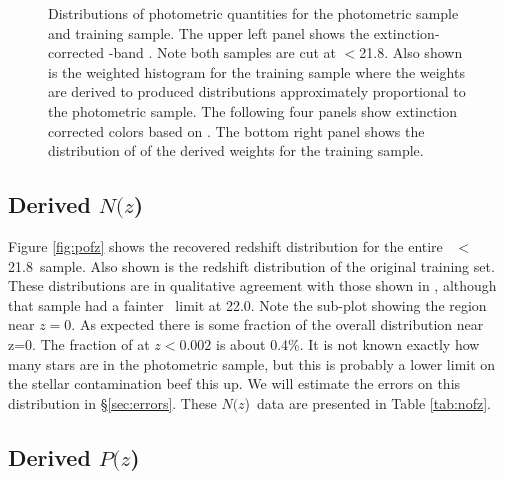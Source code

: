 \documentclass[preprint]{aastex}
\newcommand{\rmax}{21.8}
\newcommand{\pofz}{$P(z$)}
\newcommand{\Nofz}{$N(z$)}
\begin{document}
\begin{figure}[p] \centering

    \caption{Distributions of photometric quantities for the photometric sample
    and training sample.  The upper left panel shows the extinction-corrected
    \rmag-band \cmodelmag.  Note both samples are cut at \rmag$ < $\rmax.  
    Also shown is the weighted histogram for the training sample where
    the weights are derived to produced distributions approximately 
    proportional to the photometric sample.
    The following four panels show extinction corrected colors based on
    \modelmag.  The bottom right panel shows the distribution of of the
    derived weights for the training sample. }
    \label{fig:varhist}

    \vspace{2em}
\end{figure}

\subsection{Derived \Nofz}

Figure \ref{fig:pofz} shows the recovered redshift distribution for the entire
\rmag\ $<$ \rmax\ sample.  Also shown is the redshift distribution of the
original training set.  These distributions are in qualitative agreement with
those shown in \citet{CunhaPhotoz09}, although that sample had a fainter \rmag\
limit at 22.0.  Note the sub-plot showing the region near $z=0$.  As expected
there is some fraction of the overall distribution near z=0.  The fraction of
at $z < 0.002$ is about 0.4\%.  It is not known exactly how many stars are in
the photometric sample, but this is probably a lower limit on the stellar
contamination {\color{red}beef this up}.  We will estimate the errors on this
distribution in \S \ref{sec:errors}. These \Nofz\ data are presented in Table
\ref{tab:nofz}.


\subsection{Derived \pofz}
\end{document}
